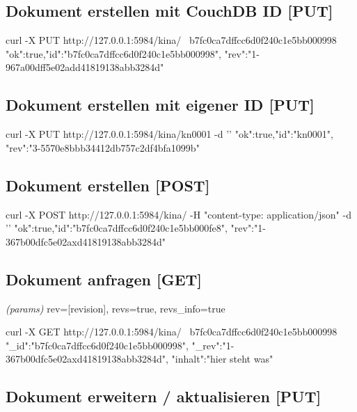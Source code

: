 \documentclass[19pt,landscape,twocolumn]{article}
\newcommand{\htmlverb}[1]{{[}\textbf{{#1}}{]}}
\begin{document}
\subsection{Dokument erstellen mit CouchDB ID \htmlverb{PUT}}

\begin{code}
curl -X PUT http://127.0.0.1:5984/kina/ \
  b7fc0ca7dffcc6d0f240c1e5bb000998
{"ok":true,"id":"b7fc0ca7dffcc6d0f240c1e5bb000998",
 "rev":"1-967a00dff5e02add41819138abb3284d"}
\end{code}

\subsection{Dokument erstellen mit eigener ID \htmlverb{PUT}}

\begin{code}
curl -X PUT http://127.0.0.1:5984/kina/kn0001 -d '{}'
{"ok":true,"id":"kn0001",
 "rev":"3-5570e8bbb34412db757c2df4bfa1099b"}
\end{code}

\subsection{Dokument erstellen \htmlverb{POST}}

\begin{code}
curl -X POST http://127.0.0.1:5984/kina/
     -H "content-type: application/json"
     -d '{}'
{"ok":true,"id":"b7fc0ca7dffcc6d0f240c1e5bb000fe8",
 "rev":"1-367b00dfc5e02axd41819138abb3284d"}
\end{code}

\subsection{Dokument anfragen \htmlverb{GET}}
\emph{(params)} rev={[}revision{]}, revs=true, revs\_info=true

\begin{code}
curl -X GET http://127.0.0.1:5984/kina/ \
  b7fc0ca7dffcc6d0f240c1e5bb000998
{"_id":"b7fc0ca7dffcc6d0f240c1e5bb000998",
 "_rev":"1-367b00dfc5e02axd41819138abb3284d",
 "inhalt":"hier steht was"}
\end{code}

\subsection{Dokument erweitern / aktualisieren \htmlverb{PUT}}
\end{document}
